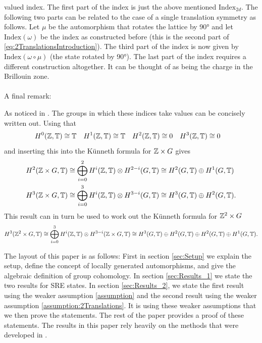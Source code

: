 \documentclass[11pt,a4paper,twoside]{article}
\numberwithin{equation}{section}
\begin{document}
	valued index. The first part of the index is just the above mentioned $\textrm{Index}_{2d}$. The following two parts can be related to the case of a single translation symmetry as follows. Let $\mu$ be the automorphism that rotates the lattice by 90° and let $\textrm{Index}(\omega)$ be the index as constructed before (this is the second part of \ref{eq:2TranslationsIntroduction}). The third part of the index is now given by $\textrm{Index}(\omega\circ\mu)$ (the state rotated by 90°). The last part of the index requires a different construction altogether. It can be thought of as being the charge in the Brillouin zone.
	\\\\
	A final remark:
	\begin{remark}
		As noticed in \cite{Chen_2013}. The groups in which these indices take values can be concisely written out. Using that
		\begin{align}
			H^0(\mathbb Z,\mathbb T)&\cong \mathbb T& H^1(\mathbb Z,\mathbb T)&\cong \mathbb T& H^2(\mathbb Z,\mathbb T)&\cong 0&H^3(\mathbb Z,\mathbb T)&\cong 0
		\end{align}
		and inserting this into the K\"unneth formula for $\mathbb Z\times G$ gives
		\begin{align}
			H^2(\mathbb Z \times G,\mathbb T)&\cong \bigoplus_{i=0}^2 H^i(\mathbb Z,\mathbb T)\otimes H^{2-i}(G,\mathbb T)\cong H^2(G,\mathbb T)\oplus H^1(G,\mathbb T)\\
			H^3(\mathbb Z \times G,\mathbb T)&\cong \bigoplus_{i=0}^3 H^i(\mathbb Z,\mathbb T)\otimes H^{3-i}(G,\mathbb T)\cong H^3(G,\mathbb T)\oplus H^2(G,\mathbb T).
		\end{align}
		This result can in turn be used to work out the K\"unneth formula for $\mathbb Z^2\times G$
		\begin{equation}
			H^3(\mathbb Z^2\times G,\mathbb T)\cong \bigoplus_{i=0}^3 H^i(\mathbb Z,\mathbb T)\otimes H^{3-i}(\mathbb Z\times G,\mathbb T)\cong H^3(G,\mathbb T)\oplus H^2(G,\mathbb T)\oplus H^2(G,\mathbb T)\oplus H^1(G,\mathbb T).
		\end{equation}
	\end{remark}
	The layout of this paper is as follows: First in section \ref{sec:Setup} we explain the setup, define the concept of locally generated automorphisms, and give the algebraic definition of group cohomology. In section \ref{sec:Results_1} we state the two results for SRE states. In section \ref{sec:Results_2}, we state the first result using the weaker assumption \ref{assumption} and the second result using the weaker assumption \ref{assumption:2Translations}. It is using these weaker assumptions that we then prove the statements. The rest of the paper provides a proof of these statements. The results in this paper rely heavily on the methods that were developed in \cite{ogata2021h3gmathbb}.
\end{document}
